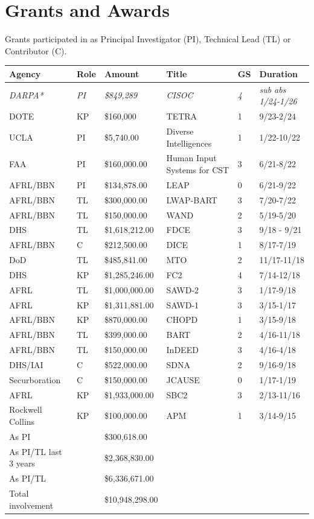 \documentclass[12pt,letterpaper]{report}
\begin{document}
\newpage 
    \section*{Grants and Awards}

Grants participated in as Principal Investigator (PI), Technical Lead (TL) or Contributor (C).

\begin{table}[!ht]
    \centering
    \begin{tabular}{|l|l|l|l|l|l|}
    \hline
      Agency & Role & Amount & Title & GS & Duration \\ \hline
        \textit{DARPA*} & \textit{PI} & \textit{\$849,289} & \textit{CISOC} & \textit{4} & \textit{sub abs 1/24-1/26} \\
        DOTE & KP & \$160,000 & TETRA & 1 &9/23-2/24 \\
        UCLA & PI & \$5,740.00 & Diverse Intelligences  & 1 & 1/22-10/22 \\ 
        FAA & PI & \$160,000.00 & Human Input Systems for CST  & 3 & 6/21-8/22 \\ 
        AFRL/BBN & PI & \$134,878.00 & LEAP & 0 & 6/21-9/22 \\ 
        AFRL/BBN & TL & \$300,000.00 & LWAP-BART & 3 & 7/20-7/22 \\ 
        AFRL/BBN & TL & \$150,000.00 & WAND  & 2 &  5/19-5/20 \\ 
        DHS    & TL     & \$1,618,212.00 & FDCE   & 3  & 9/18 - 9/21 \\ 
        AFRL/BBN & C     & \$212,500.00 & DICE & 1 &8/17-7/19 \\ 
        DoD    & TL     & \$485,841.00 & MTO & 2 & 11/17-11/18 \\ 
        DHS    & KP     & \$1,285,246.00 & FC2  & 4 &  7/14-12/18 \\ 
        AFRL   & TL     & \$1,000,000.00 & SAWD-2 &3 & 1/17-9/18 \\ 
        AFRL   & KP     & \$1,311,881.00 & SAWD-1 & 3 & 3/15-1/17 \\ 
        AFRL/BBN & KP     & \$870,000.00 & CHOPD & 1 &  3/15-9/18 \\ 
        AFRL/BBN & TL     & \$399,000.00 & BART & 2 & 4/16-11/18 \\ 
        AFRL/BBN & TL     & \$150,000.00 & InDEED & 3  &4/16-4/18 \\ 
        DHS/IAI & C     & \$522,000.00 & SDNA & 2 & 9/16-9/18 \\ 
        Securboration & C     & \$150,000.00 & JCAUSE & 0&  1/17-1/19 \\ 
        AFRL   & KP     & \$1,933,000.00 & SBC2  & 3 & 2/13-11/16 \\ 
        Rockwell Collins&KP  &\$100,000.00& APM & 1 & 3/14-9/15\\ \hline
As PI & & 		\$300,618.00 & \\
As PI/TL last 3 years & & 		\$2,368,830.00 & \\
As PI/TL & & \$6,336,671.00 & \\
Total involvement  &&		\$10,948,298.00 & \\ \hline
    \end{tabular}
\end{table}
\end{document}
